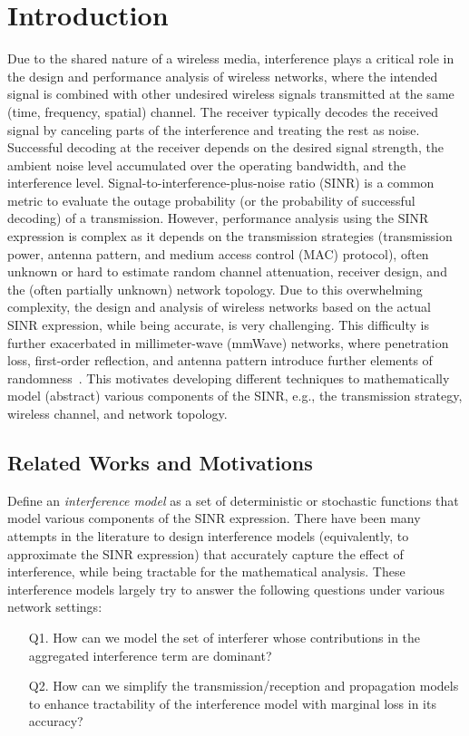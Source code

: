 \documentclass[12pt, draftclsnofoot, onecolumn]{IEEEtran}
\begin{document}
\section{Introduction}\label{sec: Intro-1}
Due to the shared nature of a wireless media, interference plays a critical role in the design and performance analysis of wireless networks, where the intended signal is combined with other undesired wireless signals transmitted at the same (time, frequency, spatial) channel. The receiver typically decodes the received signal by canceling parts of the interference and treating the rest as noise.
Successful decoding at the receiver depends on the desired signal strength, the ambient noise level accumulated over the operating bandwidth, and the interference level. Signal-to-interference-plus-noise ratio (SINR) is a common metric to evaluate the outage probability (or the probability of successful decoding) of a transmission. However, performance analysis using the SINR expression is complex as it depends on the transmission strategies (transmission power, antenna pattern, and medium access control (MAC) protocol), often unknown or hard to estimate random channel attenuation, receiver design, and the (often partially unknown) network topology.
Due to this overwhelming complexity, the design and analysis of wireless networks based on the actual SINR expression, while being accurate, is very challenging. This difficulty is further exacerbated in millimeter-wave (mmWave) networks, where penetration loss, first-order reflection, and antenna pattern introduce further elements of randomness~\cite{Akdeniz2014MillimeterWave,shokri2015mmWavecellular,di2014stochastic}.
This motivates developing different techniques to mathematically model (abstract) various components of the SINR, e.g., the transmission strategy, wireless channel, and network topology.

\subsection{Related Works and Motivations}\label{sec: motivations}
Define an \emph{interference model} as a set of deterministic or stochastic functions that model various components of the SINR expression. There have been many attempts in the literature to design interference models (equivalently, to approximate the SINR expression) that accurately capture the effect of interference, while being tractable for the mathematical analysis. These interference models largely try to answer the following questions under various network settings:
\begin{itemize}
\item[{Q1.}] How can we model the set of interferer whose contributions in the aggregated interference term are dominant?
\item[{Q2.}] How can we simplify the transmission/reception and propagation models to enhance tractability of the interference model with marginal loss in its accuracy?
\end{itemize}
\end{document}
